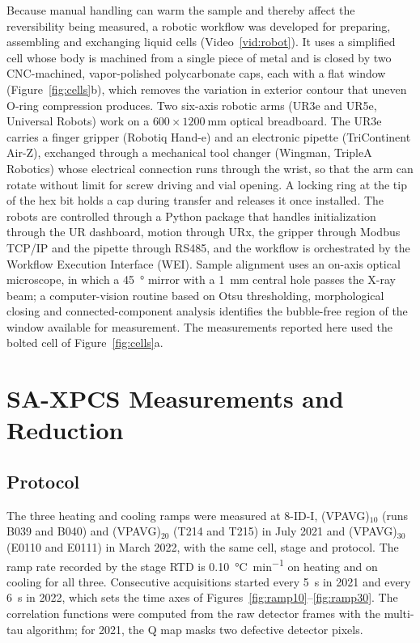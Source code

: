 \documentclass[11pt]{article}
\newcommand{\VP}[1]{(VPAVG)$_{#1}$}
\begin{document}
Because manual handling can warm the sample and thereby affect the reversibility being measured, a robotic workflow was developed for preparing, assembling and exchanging liquid cells (Video~\ref{vid:robot}). It uses a simplified cell whose body is machined from a single piece of metal and is closed by two CNC-machined, vapor-polished polycarbonate caps, each with a flat window (Figure~\ref{fig:cells}b),\cite{Ozgulbas2023-oz} which removes the variation in exterior contour that uneven O-ring compression produces. Two six-axis robotic arms (UR3e and UR5e, Universal Robots) work on a $600\times\SI{1200}{\milli\meter}$ optical breadboard. The UR3e carries a finger gripper (Robotiq Hand-e) and an electronic pipette (TriContinent Air-Z), exchanged through a mechanical tool changer (Wingman, TripleA Robotics) whose electrical connection runs through the wrist, so that the arm can rotate without limit for screw driving and vial opening. A locking ring at the tip of the hex bit holds a cap during transfer and releases it once installed. The robots are controlled through a Python package that handles initialization through the UR dashboard, motion through URx, the gripper through Modbus TCP/IP and the pipette through RS485,\cite{Ozgulbas2024-xx} and the workflow is orchestrated by the Workflow Execution Interface (WEI).\cite{Vescovi2023-qe} Sample alignment uses an on-axis optical microscope, in which a \SI{45}{\degree} mirror with a 1~mm central hole passes the X-ray beam; a computer-vision routine based on Otsu thresholding, morphological closing and connected-component analysis identifies the bubble-free region of the window available for measurement.\cite{Otsu1979-ieee,Du2024-xx} The measurements reported here used the bolted cell of Figure~\ref{fig:cells}a.

\section{SA-XPCS Measurements and Reduction}

\subsection{Protocol}

The three heating and cooling ramps were measured at 8-ID-I, \VP{10} (runs B039 and B040) and \VP{20} (T214 and T215) in July 2021 and \VP{30} (E0110 and E0111) in March 2022, with the same cell, stage and protocol. The ramp rate recorded by the stage RTD is \SI{0.10}{\degreeCelsius\per\minute} on heating and on cooling for all three. Consecutive acquisitions started every \SI{5}{\second} in 2021 and every \SI{6}{\second} in 2022, which sets the time axes of Figures~\ref{fig:ramp10}--\ref{fig:ramp30}. The correlation functions were computed from the raw detector frames with the multi-tau algorithm;\cite{Switalski2022-ig} for 2021, the Q map masks two defective detector pixels.
\end{document}
